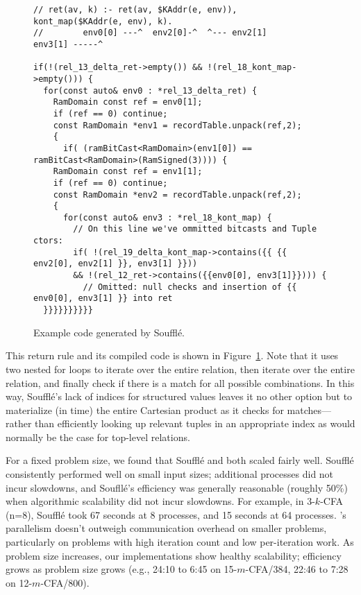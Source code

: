 \begin{figure}
\small
\begin{Verbatim}[baselinestretch=.8]
// ret(av, k) :- ret(av, $KAddr(e, env)), kont_map($KAddr(e, env), k).
//        env0[0] ---^  env2[0]-^  ^--- env2[1]       env3[1] -----^      

if(!(rel_13_delta_ret->empty()) && !(rel_18_kont_map->empty())) {
  for(const auto& env0 : *rel_13_delta_ret) {
    RamDomain const ref = env0[1];
    if (ref == 0) continue;
    const RamDomain *env1 = recordTable.unpack(ref,2);
    {
      if( (ramBitCast<RamDomain>(env1[0]) == ramBitCast<RamDomain>(RamSigned(3)))) {
	RamDomain const ref = env1[1];
	if (ref == 0) continue;
	const RamDomain *env2 = recordTable.unpack(ref,2);
	{
	  for(const auto& env3 : *rel_18_kont_map) {
	    // On this line we've ommitted bitcasts and Tuple ctors:
	    if( !(rel_19_delta_kont_map->contains({{ {{ env2[0], env2[1] }}, env3[1] }}))
		&& !(rel_12_ret->contains({{env0[0], env3[1]}}))) {
	      // Omitted: null checks and insertion of {{ env0[0], env3[1] }} into ret
  }}}}}}}}}}
\end{Verbatim}
\caption{Example \CC{} code generated by Souffl\'e.}
\label{fig:souffle-cpp}
\end{figure}

This return rule and its compiled \CC{} code is shown
in Figure~\ref{fig:souffle-cpp}. Note that it uses two nested for loops to iterate over the entire  relation, then iterate over the entire  relation, and finally check if there is a match for all possible combinations. In this way, Souffl\'e's lack of indices for structured values leaves it no other option but to materialize (in time) the entire Cartesian product as it checks for matches---rather than efficiently looking up relevant tuples in an appropriate index as would normally be the case for top-level relations.

For a fixed problem size, we found that Souffl\'e and \slog{} both
scaled fairly well. Souffl\'e consistently performed well on small
input sizes; additional processes did not incur slowdowns, and
Soufll\'e's efficiency was generally reasonable (roughly 50\%) when
algorithmic scalability did not incur slowdowns. For example, in
3-$k$-CFA (n=$8$), Souffl\'e took 67 seconds at 8 processes, and 15
seconds at 64 processes. \slog{}'s parallelism doesn't outweigh
communication overhead on smaller problems, particularly on problems
with high iteration count and low per-iteration work. As problem size
increases, our \slog{} implementations show healthy scalability;
efficiency grows as problem size grows (e.g., 24:10 to 6:45 on
15-$m$-CFA/384, 22:46 to 7:28 on 12-$m$-CFA/800).

